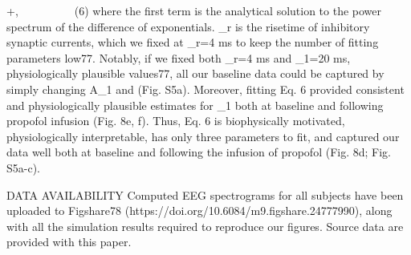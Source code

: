 +\lambda,\ \ \ \ \ \ \ \ \ \ (6)
where the first term is the analytical solution to the power spectrum of the difference of exponentials. \tau_r is the risetime of inhibitory synaptic currents, which we fixed at \tau_r=4 ms to keep the number of fitting parameters low77. Notably, if we fixed both \tau_r=4 ms and \tau_1=20 ms, physiologically plausible values77, all our baseline data could be captured by simply changing A_1 and \lambda (Fig. S5a). Moreover, fitting Eq. 6 provided consistent and physiologically plausible estimates for \tau_1 both at baseline and following propofol infusion (Fig. 8e, f). Thus, Eq. 6 is biophysically motivated, physiologically interpretable, has only three parameters to fit, and captured our data well both at baseline and following the infusion of propofol (Fig. 8d; Fig. S5a-c). 

DATA AVAILABILITY
Computed EEG spectrograms for all subjects have been uploaded to Figshare78 (https://doi.org/10.6084/m9.figshare.24777990), along with all the simulation results required to reproduce our figures. Source data are provided with this paper.

